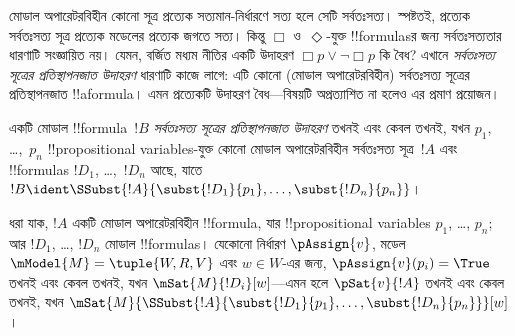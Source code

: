 \documentclass[../../../include/open-logic-section]{subfiles}
\begin{document}


\begin{explain}
মোডাল অপারেটরবিহীন কোনো সূত্র প্রত্যেক সত্যমান-নির্ধারণে সত্য হলে সেটি
সর্বতঃসত্য। স্পষ্টতই, প্রত্যেক সর্বতঃসত্য সূত্র প্রত্যেক মডেলের প্রত্যেক
জগতে সত্য। কিন্তু $\Box$ ও~$\Diamond$-যুক্ত !!{formula}sর জন্য
সর্বতঃসত্যতার ধারণাটি সংজ্ঞায়িত নয়। যেমন, বর্জিত মধ্যম নীতির একটি
উদাহরণ $\Box p \lor \lnot \Box p$ কি বৈধ? এখানে
\emph{সর্বতঃসত্য সূত্রের প্রতিস্থাপনজাত উদাহরণ} ধারণাটি কাজে লাগে:
এটি কোনো (মোডাল অপারেটরবিহীন) সর্বতঃসত্য সূত্রের প্রতিস্থাপনজাত
!!a{formula}। এমন প্রত্যেকটি উদাহরণ বৈধ—বিষয়টি অপ্রত্যাশিত না হলেও
এর প্রমাণ প্রয়োজন।
\end{explain}

\begin{defn}
  একটি মোডাল !!{formula}~$!B$ \emph{সর্বতঃসত্য সূত্রের প্রতিস্থাপনজাত
  উদাহরণ} তখনই এবং কেবল তখনই, যখন $p_1$, \dots,~$p_n$
  !!{propositional
    variable}s-যুক্ত কোনো মোডাল অপারেটরবিহীন সর্বতঃসত্য
  সূত্র~$!A$ এবং !!{formula}s $!D_1$, \dots,~$!D_n$ আছে, যাতে
  $!B \ident \SSubst{!A}{\subst{!D_1}{p_1},
    \dots, \subst{!D_n}{p_n}}$।
\end{defn}

\begin{lem}
  ধরা যাক, $!A$ একটি মোডাল অপারেটরবিহীন !!{formula}, যার
  !!{propositional
  variable}s $p_1$, \dots, $p_n$; আর $!D_1$,
  \dots, $!D_n$ মোডাল !!{formula}s। যেকোনো নির্ধারণ $\pAssign{v}$,
  মডেল $\mModel{M} = \tuple{W, R, V}$ এবং $w \in W$-এর জন্য,
  $\pAssign{v}(p_i) = \True$ তখনই এবং কেবল তখনই, যখন
  $\mSat{M}{!D_i}[w]$—এমন হলে $\pSat{v}{!A}$ তখনই এবং কেবল তখনই, যখন
  $\mSat{M}{\SSubst{!A}{\subst{!D_1}{p_1}, \dots,
      \subst{!D_n}{p_n}}}[w]$।
\end{lem}
\end{document}

